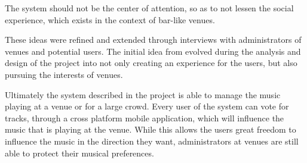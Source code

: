 The system should not be the center of attention, so as to not lessen the social experience, which exists in the context of bar-like venues.

These ideas were refined and extended through interviews with administrators of venues and potential users. The initial idea from  evolved during the analysis and design of the project into not only creating an experience for the users, but also pursuing the interests of venues.

Ultimately the system described in the project is able to manage the music playing at a venue or for a large crowd. Every user of the system can vote for tracks, through a cross platform mobile application, which will influence the music that is playing at the venue. While this allows the users great freedom to influence the music in the direction they want, administrators at venues are still able to protect their musical preferences.

